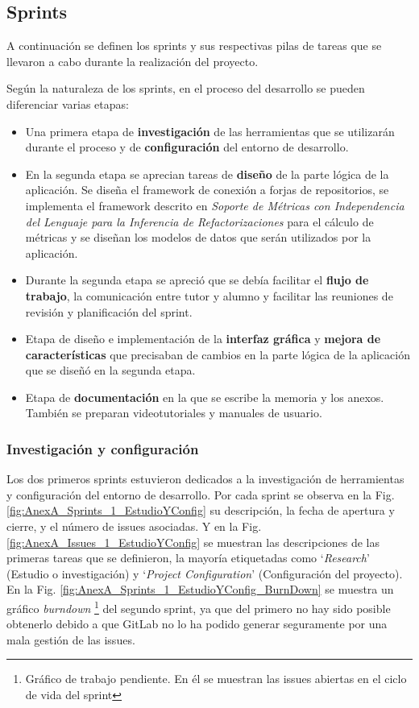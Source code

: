 \subsection{Sprints}
A continuación se definen los sprints y sus respectivas pilas de tareas que se llevaron a cabo durante la realización del proyecto. 

Según la naturaleza de los sprints, en el proceso del desarrollo se pueden diferenciar varias etapas:
\begin{itemize}
	\item  Una primera etapa de \textbf{investigación} de las herramientas que se utilizarán durante el proceso y de \textbf{configuración} del entorno de desarrollo.
	\item En la segunda etapa se aprecian tareas de \textbf{diseño} de la parte lógica de la aplicación. Se diseña el framework de conexión a forjas de repositorios, se implementa el framework descrito en \textit{Soporte de Métricas con Independencia del Lenguaje para la Inferencia de Refactorizaciones}  \cite{marticorena_soporte_2005} para el cálculo de métricas y se diseñan los modelos de datos que serán utilizados por la aplicación.
	\item Durante la segunda etapa se apreció que se debía facilitar el \textbf{flujo de trabajo}, la comunicación entre tutor y alumno y facilitar las reuniones de revisión y planificación del sprint.
	\item Etapa  de diseño e implementación de la \textbf{interfaz gráfica} y \textbf{mejora de características} que precisaban de cambios en la parte lógica de la aplicación que se diseñó en la segunda etapa.
	\item Etapa de \textbf{documentación} en la que se escribe la memoria y los anexos. También se preparan videotutoriales y manuales de usuario.
\end{itemize}

\subsubsection{Investigación y configuración}

Los dos primeros sprints estuvieron dedicados a la investigación de herramientas y configuración del entorno de desarrollo. Por cada sprint se observa en la Fig. \ref{fig:AnexA_Sprints_1_EstudioYConfig} su descripción, la fecha de apertura y cierre, y el número de issues asociadas. Y en la Fig. \ref{fig:AnexA_Issues_1_EstudioYConfig} se muestran las descripciones de las primeras tareas que se definieron, la mayoría etiquetadas como `\textit{Research}' (Estudio o investigación) y `\textit{Project Configuration}' (Configuración del proyecto). En la Fig. \ref{fig:AnexA_Sprints_1_EstudioYConfig_BurnDown} se muestra un gráfico \textit{burndown} \footnote{Gráfico de trabajo pendiente. En él se muestran las issues abiertas en el ciclo de vida del sprint} del segundo sprint, ya que del primero no hay sido posible obtenerlo debido a que GitLab no lo ha podido generar seguramente por una mala gestión de las issues.


